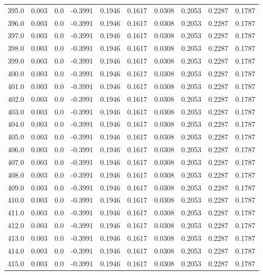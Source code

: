 \begin{longtable}{lrrrrrrrrr}
395.0 & 0.003 & 0.0 & -0.3991 & 0.1946 & 0.1617 & 0.0308 & 0.2053 & 0.2287 & 0.1787 \\
396.0 & 0.003 & 0.0 & -0.3991 & 0.1946 & 0.1617 & 0.0308 & 0.2053 & 0.2287 & 0.1787 \\
397.0 & 0.003 & 0.0 & -0.3991 & 0.1946 & 0.1617 & 0.0308 & 0.2053 & 0.2287 & 0.1787 \\
398.0 & 0.003 & 0.0 & -0.3991 & 0.1946 & 0.1617 & 0.0308 & 0.2053 & 0.2287 & 0.1787 \\
399.0 & 0.003 & 0.0 & -0.3991 & 0.1946 & 0.1617 & 0.0308 & 0.2053 & 0.2287 & 0.1787 \\
400.0 & 0.003 & 0.0 & -0.3991 & 0.1946 & 0.1617 & 0.0308 & 0.2053 & 0.2287 & 0.1787 \\
401.0 & 0.003 & 0.0 & -0.3991 & 0.1946 & 0.1617 & 0.0308 & 0.2053 & 0.2287 & 0.1787 \\
402.0 & 0.003 & 0.0 & -0.3991 & 0.1946 & 0.1617 & 0.0308 & 0.2053 & 0.2287 & 0.1787 \\
403.0 & 0.003 & 0.0 & -0.3991 & 0.1946 & 0.1617 & 0.0308 & 0.2053 & 0.2287 & 0.1787 \\
404.0 & 0.003 & 0.0 & -0.3991 & 0.1946 & 0.1617 & 0.0308 & 0.2053 & 0.2287 & 0.1787 \\
405.0 & 0.003 & 0.0 & -0.3991 & 0.1946 & 0.1617 & 0.0308 & 0.2053 & 0.2287 & 0.1787 \\
406.0 & 0.003 & 0.0 & -0.3991 & 0.1946 & 0.1617 & 0.0308 & 0.2053 & 0.2287 & 0.1787 \\
407.0 & 0.003 & 0.0 & -0.3991 & 0.1946 & 0.1617 & 0.0308 & 0.2053 & 0.2287 & 0.1787 \\
408.0 & 0.003 & 0.0 & -0.3991 & 0.1946 & 0.1617 & 0.0308 & 0.2053 & 0.2287 & 0.1787 \\
409.0 & 0.003 & 0.0 & -0.3991 & 0.1946 & 0.1617 & 0.0308 & 0.2053 & 0.2287 & 0.1787 \\
410.0 & 0.003 & 0.0 & -0.3991 & 0.1946 & 0.1617 & 0.0308 & 0.2053 & 0.2287 & 0.1787 \\
411.0 & 0.003 & 0.0 & -0.3991 & 0.1946 & 0.1617 & 0.0308 & 0.2053 & 0.2287 & 0.1787 \\
412.0 & 0.003 & 0.0 & -0.3991 & 0.1946 & 0.1617 & 0.0308 & 0.2053 & 0.2287 & 0.1787 \\
413.0 & 0.003 & 0.0 & -0.3991 & 0.1946 & 0.1617 & 0.0308 & 0.2053 & 0.2287 & 0.1787 \\
414.0 & 0.003 & 0.0 & -0.3991 & 0.1946 & 0.1617 & 0.0308 & 0.2053 & 0.2287 & 0.1787 \\
415.0 & 0.003 & 0.0 & -0.3991 & 0.1946 & 0.1617 & 0.0308 & 0.2053 & 0.2287 & 0.1787 \\

\end{longtable}
